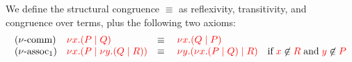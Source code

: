 \begin{definition}\label{def:cp-equiv}
  We define the structural congruence $\equiv$ as reflexivity, transitivity, and
  congruence over terms, plus the following two axioms:
  \[
    \begin{array}{llll}
      (\nu\text{-comm})
      & \textcolor{red}{\nu x.(P \mid Q)}
      & \equiv \;
      & \textcolor{red}{\nu x.(Q \mid P)}
      \\
      (\nu\text{-assoc}_{1})
      & \textcolor{red}{\nu x.(P \mid \nu y.(Q \mid R))}
      & \equiv \;
      & \textcolor{red}{\nu y.(\nu x.(P \mid Q) \mid R)}
        \quad \text{if} \; \textcolor{red}{x}\not\in\textcolor{red}{R} \; \text{and} \; \textcolor{red}{y}\not\in\textcolor{red}{P}
    \end{array}
  \]
\end{definition}
